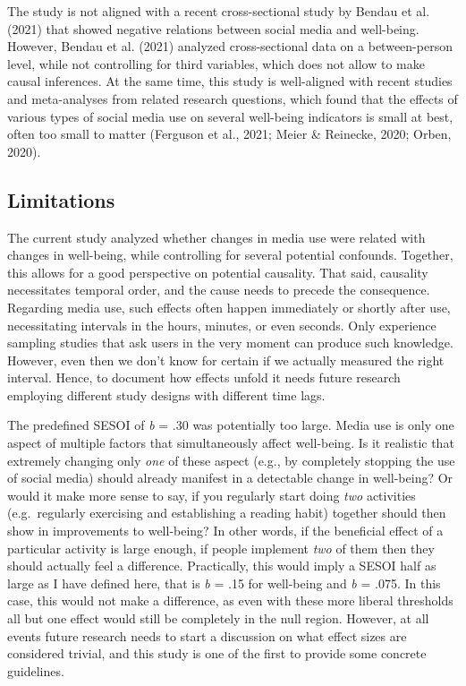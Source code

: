 \documentclass[
  english,
  man,mask,floatsintext]{apa6}
\begin{document}
The study is not aligned with a recent cross-sectional study by Bendau et al. (2021) that showed negative relations between social media and well-being.
However, Bendau et al. (2021) analyzed cross-sectional data on a between-person level, while not controlling for third variables, which does not allow to make causal inferences.
At the same time, this study is well-aligned with recent studies and meta-analyses from related research questions, which found that the effects of various types of social media use on several well-being indicators is small at best, often too small to matter (Ferguson et al., 2021; Meier \& Reinecke, 2020; Orben, 2020).

\hypertarget{limitations}{%
\subsection{Limitations}\label{limitations}}

The current study analyzed whether changes in media use were related with changes in well-being, while controlling for several potential confounds.
Together, this allows for a good perspective on potential causality.
That said, causality necessitates temporal order, and the cause needs to precede the consequence.
Regarding media use, such effects often happen immediately or shortly after use, necessitating intervals in the hours, minutes, or even seconds.
Only experience sampling studies that ask users in the very moment can produce such knowledge.
However, even then we don't know for certain if we actually measured the right interval.
Hence, to document how effects unfold it needs future research employing different study designs with different time lags.

The predefined SESOI of \emph{b} = .30 was potentially too large.
Media use is only one aspect of multiple factors that simultaneously affect well-being.
Is it realistic that extremely changing only \emph{one} of these aspect (e.g., by completely stopping the use of social media) should already manifest in a detectable change in well-being?
Or would it make more sense to say, if you regularly start doing \emph{two} activities (e.g.~regularly exercising and establishing a reading habit) together should then show in improvements to well-being?
In other words, if the beneficial effect of a particular activity is large enough, if people implement \emph{two} of them then they should actually feel a difference.
Practically, this would imply a SESOI half as large as I have defined here, that is \emph{b} = \textbar.15\textbar{} for well-being and \emph{b} = \textbar.075\textbar.
In this case, this would not make a difference, as even with these more liberal thresholds all but one effect would still be completely in the null region.
However, at all events future research needs to start a discussion on what effect sizes are considered trivial, and this study is one of the first to provide some concrete guidelines.
\end{document}
